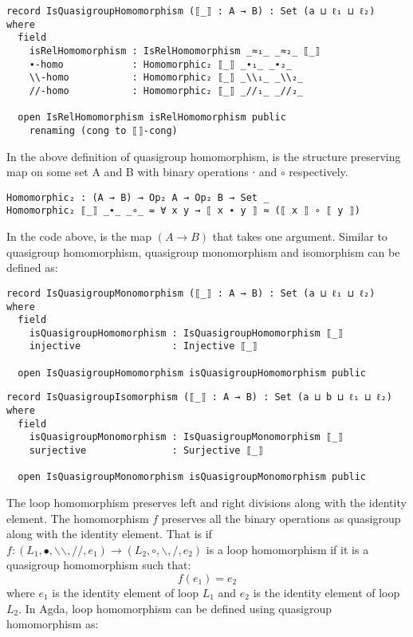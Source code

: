 \begin{verbatim}
record IsQuasigroupHomomorphism (⟦_⟧ : A → B) : Set (a ⊔ ℓ₁ ⊔ ℓ₂) where
  field
    isRelHomomorphism : IsRelHomomorphism _≈₁_ _≈₂_ ⟦_⟧
    ∙-homo            : Homomorphic₂ ⟦_⟧ _∙₁_ _∙₂_
    \\-homo           : Homomorphic₂ ⟦_⟧ _\\₁_ _\\₂_
    //-homo           : Homomorphic₂ ⟦_⟧ _//₁_ _//₂_

  open IsRelHomomorphism isRelHomomorphism public
    renaming (cong to ⟦⟧-cong)
\end{verbatim}

In the above definition of quasigroup homomorphism,  is the
structure preserving map on some set A and B with binary operations ∙ and
$\circ$ respectively.

\begin{verbatim}
Homomorphic₂ : (A → B) → Op₂ A → Op₂ B → Set _
Homomorphic₂ ⟦_⟧ _∙_ _∘_ = ∀ x y → ⟦ x ∙ y ⟧ ≈ (⟦ x ⟧ ∘ ⟦ y ⟧)
\end{verbatim}

In the code above,  is the map $(A \rightarrow B)$ that takes one
argument. Similar to quasigroup homomorphism, quasigroup monomorphism and
isomorphism can be defined as: 

\begin{verbatim}
record IsQuasigroupMonomorphism (⟦_⟧ : A → B) : Set (a ⊔ ℓ₁ ⊔ ℓ₂) where
  field
    isQuasigroupHomomorphism : IsQuasigroupHomomorphism ⟦_⟧
    injective                : Injective ⟦_⟧

  open IsQuasigroupHomomorphism isQuasigroupHomomorphism public
\end{verbatim}

\begin{verbatim}
record IsQuasigroupIsomorphism (⟦_⟧ : A → B) : Set (a ⊔ b ⊔ ℓ₁ ⊔ ℓ₂) where
  field
    isQuasigroupMonomorphism : IsQuasigroupMonomorphism ⟦_⟧
    surjective               : Surjective ⟦_⟧

  open IsQuasigroupMonomorphism isQuasigroupMonomorphism public
\end{verbatim}

The loop homomorphism preserves left and right divisions along with the identity
element. The homomorphism $f$ preserves all the binary operations as quasigroup
along with the identity element. That is if \( f:(L_1,∙,\backslash
\backslash,//,e_1) \rightarrow (L_2,\circ,\backslash,/,e_2) \) is a loop homomorphism if
it is a quasigroup homomorphism such that: 
\[f(e_1) = e_2\] where $e_1$ is the identity element of loop $L_1$ and $e_2$ is
the identity element of loop $L_2$. In Agda, loop homomorphism can be defined
using quasigroup homomorphism as:

